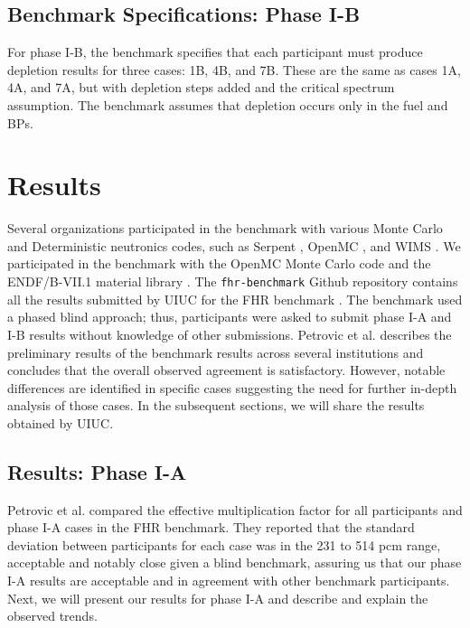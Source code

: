 \subsection{Benchmark Specifications: Phase I-B}
For phase I-B, the benchmark specifies that each participant must produce 
depletion results for three cases: 1B, 4B, and 7B. 
These are the same as cases 1A, 4A, and 7A, but with depletion steps added and
the critical spectrum assumption. 
The benchmark assumes that depletion occurs only in the fuel and \glspl{BP}. 

\section{Results}
Several organizations participated in the benchmark with various Monte Carlo
and Deterministic neutronics codes, such as Serpent \cite{leppanen_serpent_2014}, 
OpenMC \cite{romano_openmc_2013}, and WIMS \cite{lindley_current_2017}. 
We participated in the benchmark with the OpenMC Monte Carlo code 
\cite{romano_openmc_2013} and the ENDF/B-VII.1 material library 
\cite{chadwick_endf/b-vii.1_2011}.
The \texttt{fhr-benchmark} Github repository contains all the results submitted 
by \gls{UIUC} for the \gls{FHR} benchmark \cite{chee_arfcfhr-benchmark_2021}. 
The benchmark used a phased blind approach; thus, participants were asked to 
submit phase I-A and I-B results without knowledge of other submissions. 
Petrovic et al. \cite{petrovic_preliminary_2021} describes the preliminary 
results of the benchmark results across several institutions and concludes 
that the overall observed agreement is satisfactory. 
However, notable differences are identified in specific cases suggesting the 
need for further in-depth analysis of those cases. 
In the subsequent sections, we will share the results obtained by \gls{UIUC}.  

\subsection{Results: Phase I-A}
Petrovic et al. \cite{petrovic_preliminary_2021} compared the effective 
multiplication factor for all participants and phase I-A cases in the \gls{FHR} 
benchmark. 
They reported that the standard deviation between participants for each case 
was in the 231 to 514 pcm range, acceptable and notably close given a blind 
benchmark, assuring us that our phase I-A results are acceptable and in agreement 
with other benchmark participants. 
Next, we will present our results for phase I-A and describe and explain the 
observed trends.

